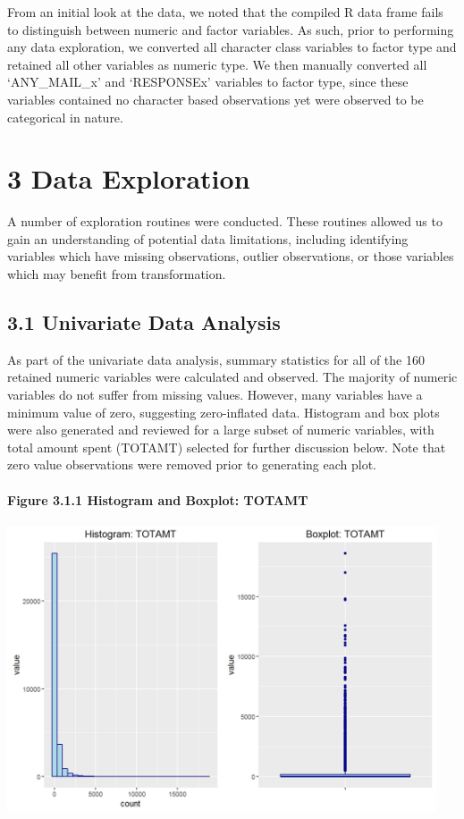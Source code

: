 \documentclass[]{article}
\let\oldparagraph\paragraph
\renewcommand{\paragraph}[1]{\oldparagraph{#1}\mbox{}}
\begin{document}
From an initial look at the data, we noted that the compiled R data
frame fails to distinguish between numeric and factor variables. As
such, prior to performing any data exploration, we converted all
character class variables to factor type and retained all other
variables as numeric type. We then manually converted all `ANY\_MAIL\_x'
and `RESPONSEx' variables to factor type, since these variables
contained no character based observations yet were observed to be
categorical in nature.

\section{3 Data Exploration}\label{data-exploration}

A number of exploration routines were conducted. These routines allowed
us to gain an understanding of potential data limitations, including
identifying variables which have missing observations, outlier
observations, or those variables which may benefit from transformation.

\subsection{3.1 Univariate Data
Analysis}\label{univariate-data-analysis}

As part of the univariate data analysis, summary statistics for all of
the 160 retained numeric variables were calculated and observed. The
majority of numeric variables do not suffer from missing values.
However, many variables have a minimum value of zero, suggesting
zero-inflated data. Histogram and box plots were also generated and
reviewed for a large subset of numeric variables, with total amount
spent (TOTAMT) selected for further discussion below. Note that zero
value observations were removed prior to generating each plot.

\paragraph{Figure 3.1.1 Histogram and Boxplot:
TOTAMT}\label{figure-3.1.1-histogram-and-boxplot-totamt}

\includegraphics[height=3.33333in]{images/expl_num_TOTAMT.png}
\end{document}
